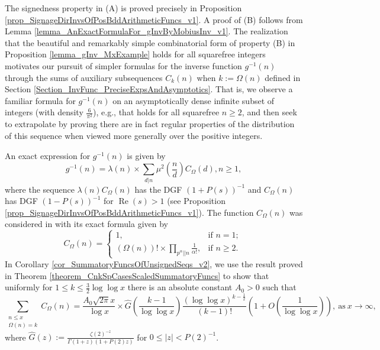 \documentclass[11pt,reqno,a4letter]{article}
\numberwithin{figure}{section}
\numberwithin{table}{section}
\newcommand{\cf}{\textit{cf.\ }}
\theoremstyle{plain}
\numberwithin{theorem}{section}
\theoremstyle{definition}
\renewcommand{\Re}{\operatorname{Re}}
\begin{document}
The signedness property in (A) is proved precisely in 
Proposition \ref{prop_SignageDirInvsOfPosBddArithmeticFuncs_v1}. 
A proof of (B) follows from 
Lemma \ref{lemma_AnExactFormulaFor_gInvByMobiusInv_v1}. 
The realization that the beautiful and remarkably simple combinatorial form of property (B) 
in Proposition \ref{lemma_gInv_MxExample} holds for all squarefree integers 
motivates our pursuit of simpler formulas for the inverse function $g^{-1}(n)$ 
through the sums of auxiliary subsequences $C_k(n)$ when $k := \Omega(n)$ 
defined in Section \ref{Section_InvFunc_PreciseExpsAndAsymptotics}. 
That is, we observe a familiar formula for $g^{-1}(n)$ 
on an asymptotically dense infinite subset of integers (with density $\frac{6}{\pi^2}$), 
e.g., that holds for all squarefree $n \geq 2$, and then seek 
to extrapolate by proving there are in fact 
regular properties of the distribution of this sequence when viewed 
more generally over the positive integers. 

An exact expression for $g^{-1}(n)$ is given by 
\[
g^{-1}(n) = \lambda(n) \times \sum_{d|n} \mu^2\left(\frac{n}{d}\right) C_{\Omega}(d), n \geq 1,  
\]
where the sequence $\lambda(n) C_{\Omega}(n)$ has the DGF $(1 + P(s))^{-1}$ and 
$C_{\Omega}(n)$ has DGF $(1-P(s))^{-1}$ for $\Re(s) > 1$ 
(see Proposition \ref{prop_SignageDirInvsOfPosBddArithmeticFuncs_v1}). 
The function $C_{\Omega}(n)$ was considered in 
\cite{FROBERG-1968} with its exact formula 
given by \cite[\cf \S 3]{CLT-RANDOM-ORDERED-FACTS-2011} 
\[
C_{\Omega}(n) = \begin{cases}
     1, & \text{if $n = 1$; } \\ 
     (\Omega(n))! \times \prod\limits_{p^{\alpha}||n} \frac{1}{\alpha!}, & \text{if $n \geq 2$. }
     \end{cases}
\]
In Corollary \ref{cor_SummatoryFuncsOfUnsignedSeqs_v2}, 
we use the result proved in 
Theorem \ref{theorem_CnkSpCasesScaledSummatoryFuncs} 
to show that uniformly for $1 \leq k \leq \frac{3}{2} \log\log x$ there is an absolute 
constant $A_0 > 0$ such that 
\[
\sum_{\substack{n \leq x \\ \Omega(n)=k}} C_{\Omega}(n) = 
     \frac{A_0 \sqrt{2\pi} x}{\log x} \times 
     \widehat{G}\left(\frac{k-1}{\log\log x}\right) 
     \frac{(\log\log x)^{k-\frac{1}{2}}}{(k-1)!} \left( 
     1 + O\left(\frac{1}{\log\log x}\right)\right), 
     \mathrm{\ as\ } x \rightarrow \infty, 
\]
where $\widehat{G}(z) := \frac{\zeta(2)^{-z}}{\Gamma(1+z) (1+P(2)z)}$ for 
$0 \leq |z| < P(2)^{-1}$. 
\end{document}
